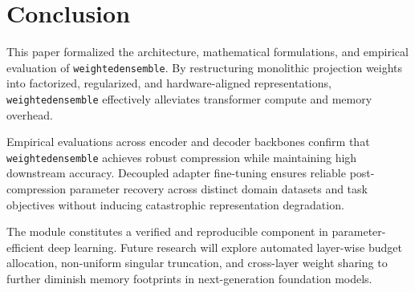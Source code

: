 \section{Conclusion}
This paper formalized the architecture, mathematical formulations, and empirical evaluation of \texttt{weightedensemble}. By restructuring monolithic projection weights into factorized, regularized, and hardware-aligned representations, \texttt{weightedensemble} effectively alleviates transformer compute and memory overhead.

Empirical evaluations across encoder and decoder backbones confirm that \texttt{weightedensemble} achieves robust compression while maintaining high downstream accuracy. Decoupled adapter fine-tuning ensures reliable post-compression parameter recovery across distinct domain datasets and task objectives without inducing catastrophic representation degradation.

The module constitutes a verified and reproducible component in parameter-efficient deep learning. Future research will explore automated layer-wise budget allocation, non-uniform singular truncation, and cross-layer weight sharing to further diminish memory footprints in next-generation foundation models.
